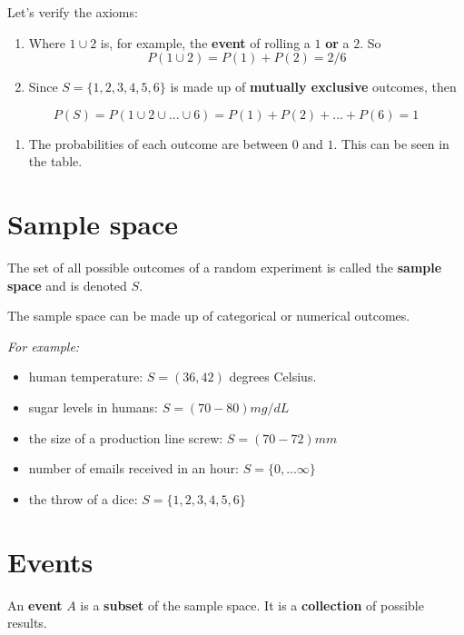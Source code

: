 \documentclass[
]{book}
\providecommand{\tightlist}{%
  \setlength{\itemsep}{0pt}\setlength{\parskip}{0pt}}
\begin{document}
Let's verify the axioms:

\begin{enumerate}
\def\labelenumi{\arabic{enumi})}
\item
  Where \(1 \cup 2\) is, for example, the \textbf{event} of rolling a \(1\) \textbf{or} a \(2\). So \[ P( 1 \cup 2)=P(1)+P(2)=2/6\]
\item
  Since \(S= \{ 1,2,3,4,5,6\}\) is made up of \textbf{mutually exclusive} outcomes, then
\end{enumerate}

\[P(S)=P(1\cup 2\cup ... \cup 6) = P(1)+P(2)+ ...+P(6)=1\]

\begin{enumerate}
\def\labelenumi{\arabic{enumi})}
\setcounter{enumi}{2}
\tightlist
\item
  The probabilities of each outcome are between \(0\) and \(1\). This can be seen in the table.
\end{enumerate}

\hypertarget{sample-space}{%
\section{Sample space}\label{sample-space}}

The set of all possible outcomes of a random experiment is called the \textbf{sample space} and is denoted \(S\).

The sample space can be made up of categorical or numerical outcomes.

\emph{For example:}

\begin{itemize}
\tightlist
\item
  human temperature: \(S = (36, 42)\) degrees Celsius.
\item
  sugar levels in humans: \(S =( 70-80) mg/ dL\)
\item
  the size of a production line screw: \(S =( 70-72) mm\)
\item
  number of emails received in an hour: \(S = \{0, ...\infty \}\)
\item
  the throw of a dice: \(S= \{ 1, 2, 3, 4, 5, 6\}\)
\end{itemize}

\hypertarget{events}{%
\section{Events}\label{events}}

An \textbf{event} \(A\) is a \textbf{subset} of the sample space. It is a \textbf{collection} of possible results.
\end{document}
